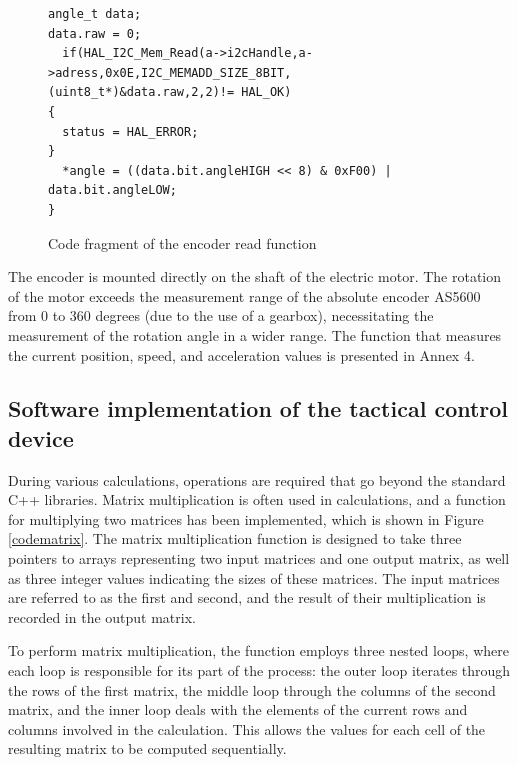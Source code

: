 \begin{figure}[H]
	\centering
	\begin{verbatim}
angle_t data;
data.raw = 0;
  if(HAL_I2C_Mem_Read(a->i2cHandle,a->adress,0x0E,I2C_MEMADD_SIZE_8BIT, (uint8_t*)&data.raw,2,2)!= HAL_OK) 
{
  status = HAL_ERROR;
}
  *angle = ((data.bit.angleHIGH << 8) & 0xF00) | data.bit.angleLOW;
}
	\end{verbatim}
	\caption{Code fragment of the encoder read function}\label{codeencoder}
\end{figure}

The encoder is mounted directly on the shaft of the electric motor. The rotation of the motor exceeds the measurement range of the absolute encoder AS5600 from 0 to 360 degrees (due to the use of a gearbox), necessitating the measurement of the rotation angle in a wider range. The function that measures the current position, speed, and acceleration values is presented in Annex 4.






\subsection{Software implementation of the tactical control device}

During various calculations, operations are required that go beyond the standard C++ libraries. Matrix multiplication is often used in calculations, and a function for multiplying two matrices has been implemented, which is shown in Figure \ref{codematrix}. The matrix multiplication function is designed to take three pointers to arrays representing two input matrices and one output matrix, as well as three integer values indicating the sizes of these matrices. The input matrices are referred to as the first and second, and the result of their multiplication is recorded in the output matrix.

To perform matrix multiplication, the function employs three nested loops, where each loop is responsible for its part of the process: the outer loop iterates through the rows of the first matrix, the middle loop through the columns of the second matrix, and the inner loop deals with the elements of the current rows and columns involved in the calculation. This allows the values for each cell of the resulting matrix to be computed sequentially.


